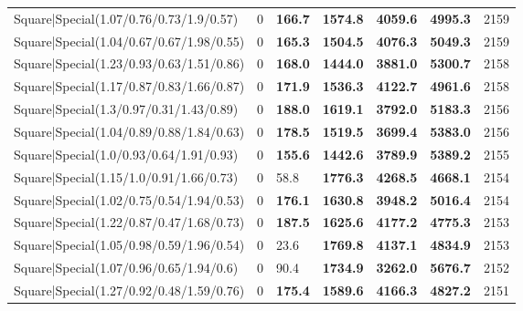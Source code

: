 \begin{tabular}{lrllllr}
 Square|Special(1.07/0.76/0.73/1.9/0.57)                       &             0   & \textbf{166.7} & \textbf{1574.8} & \textbf{4059.6} & \textbf{4995.3} &         2159 \\
 Square|Special(1.04/0.67/0.67/1.98/0.55)                      &             0   & \textbf{165.3} & \textbf{1504.5} & \textbf{4076.3} & \textbf{5049.3} &         2159 \\
 Square|Special(1.23/0.93/0.63/1.51/0.86)                      &             0   & \textbf{168.0} & \textbf{1444.0} & \textbf{3881.0} & \textbf{5300.7} &         2158 \\
 Square|Special(1.17/0.87/0.83/1.66/0.87)                      &             0   & \textbf{171.9} & \textbf{1536.3} & \textbf{4122.7} & \textbf{4961.6} &         2158 \\
 Square|Special(1.3/0.97/0.31/1.43/0.89)                       &             0   & \textbf{188.0} & \textbf{1619.1} & \textbf{3792.0} & \textbf{5183.3} &         2156 \\
 Square|Special(1.04/0.89/0.88/1.84/0.63)                      &             0   & \textbf{178.5} & \textbf{1519.5} & \textbf{3699.4} & \textbf{5383.0} &         2156 \\
 Square|Special(1.0/0.93/0.64/1.91/0.93)                       &             0   & \textbf{155.6} & \textbf{1442.6} & \textbf{3789.9} & \textbf{5389.2} &         2155 \\
 Square|Special(1.15/1.0/0.91/1.66/0.73)                       &             0   & 58.8           & \textbf{1776.3} & \textbf{4268.5} & \textbf{4668.1} &         2154 \\
 Square|Special(1.02/0.75/0.54/1.94/0.53)                      &             0   & \textbf{176.1} & \textbf{1630.8} & \textbf{3948.2} & \textbf{5016.4} &         2154 \\
 Square|Special(1.22/0.87/0.47/1.68/0.73)                      &             0   & \textbf{187.5} & \textbf{1625.6} & \textbf{4177.2} & \textbf{4775.3} &         2153 \\
 Square|Special(1.05/0.98/0.59/1.96/0.54)                      &             0   & 23.6           & \textbf{1769.8} & \textbf{4137.1} & \textbf{4834.9} &         2153 \\
 Square|Special(1.07/0.96/0.65/1.94/0.6)                       &             0   & 90.4           & \textbf{1734.9} & \textbf{3262.0} & \textbf{5676.7} &         2152 \\
 Square|Special(1.27/0.92/0.48/1.59/0.76)                      &             0   & \textbf{175.4} & \textbf{1589.6} & \textbf{4166.3} & \textbf{4827.2} &         2151 \\

\end{tabular}

